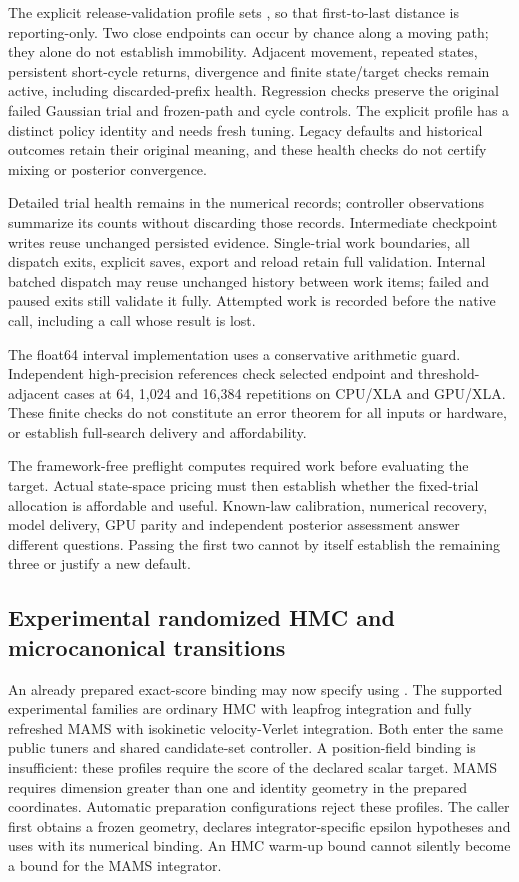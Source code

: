 The explicit release-validation profile sets
, so that first-to-last distance
is reporting-only. Two close endpoints can occur by chance along a moving
path; they alone do not establish immobility. Adjacent movement, repeated
states, persistent short-cycle returns, divergence and finite state/target
checks remain active, including discarded-prefix health. Regression checks
preserve the original failed Gaussian trial and frozen-path and cycle controls.
The explicit profile has a distinct policy identity and needs fresh tuning.
Legacy defaults and historical outcomes retain their original meaning, and
these health checks do not certify mixing or posterior convergence.

Detailed trial health remains in the numerical records; controller observations
summarize its counts without discarding those records. Intermediate checkpoint
writes reuse unchanged persisted evidence. Single-trial work boundaries, all
dispatch exits, explicit saves, export and reload retain full validation.
Internal batched dispatch may reuse unchanged history between work items;
failed and paused exits still validate it fully. Attempted work is recorded
before the native call, including a call whose result is lost.

The float64 interval implementation uses a conservative arithmetic guard.
Independent high-precision references check selected endpoint and
threshold-adjacent cases at 64, 1,024 and 16,384 repetitions on CPU/XLA and
GPU/XLA. These finite checks do not constitute an error theorem for all
inputs or hardware, or establish full-search delivery and affordability.

The framework-free preflight computes required work before evaluating the
target. Actual state-space pricing must then establish whether the fixed-trial
allocation is affordable and useful. Known-law calibration, numerical recovery,
model delivery, GPU parity and independent posterior assessment answer
different questions. Passing the first two cannot by itself establish the
remaining three or justify a new default.

\subsection{Experimental randomized HMC and microcanonical transitions}

An already prepared exact-score binding may now specify
 using
. The supported experimental families are ordinary
HMC with leapfrog integration and fully refreshed MAMS with isokinetic
velocity-Verlet integration. Both enter the same public tuners and shared
candidate-set controller. A position-field binding is insufficient: these
profiles require the score of the declared scalar target. MAMS requires
dimension greater than one and identity geometry in the prepared coordinates.
Automatic preparation configurations reject these profiles. The caller first
obtains a frozen geometry, declares integrator-specific epsilon hypotheses and
uses  with its numerical binding. An HMC warm-up bound
cannot silently become a bound for the MAMS integrator.

